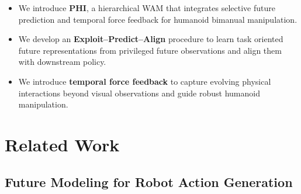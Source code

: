 \documentclass{article} %
\begin{document}


\begin{itemize}


\item We introduce \textbf{PHI}, a hierarchical WAM that integrates selective future prediction and temporal force feedback for humanoid bimanual manipulation.

\item We develop an \textbf{Exploit--Predict--Align} procedure to learn task oriented future representations from privileged future observations and align them with downstream policy.

\item We introduce \textbf{temporal force feedback} to capture evolving physical interactions beyond visual observations and guide robust humanoid manipulation.
\end{itemize}




\section{Related Work}

\subsection{Future Modeling for Robot Action Generation}
\label{sec:related_future_prediction}
\end{document}
